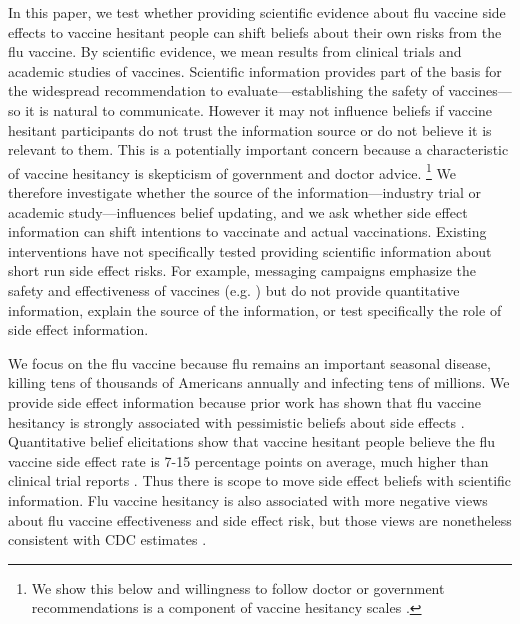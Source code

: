 In this paper, we test whether providing scientific evidence about flu vaccine side effects 
to vaccine hesitant people can shift beliefs about their own risks from the flu vaccine. By scientific evidence, we mean results from clinical trials and academic studies of vaccines.
Scientific information provides part of the basis for the widespread recommendation to 
evaluate---establishing the safety of vaccines---so it is natural to communicate. 
However it may not influence beliefs if vaccine hesitant participants do not trust the 
information source or do not believe it is relevant to them. This is a potentially 
important concern because a characteristic of vaccine hesitancy is skepticism of 
government and doctor advice.%
\footnote{We show this below and willingness to follow doctor or government recommendations
is a component of vaccine hesitancy scales \citep{larson2015measuring}.}
We therefore investigate whether 
the source of the information---industry trial or academic study---influences belief updating, 
and we ask whether
side effect information can shift intentions to vaccinate and actual vaccinations.
Existing interventions have not specifically tested providing scientific information about
short run side effect risks. For example, messaging campaigns emphasize the safety and 
effectiveness of vaccines (e.g. \citet{athey2023digital,alsan2024experimental}) but do 
not provide quantitative information, explain the source of the information, or test 
specifically the role of side effect information.

We focus on the flu vaccine because flu remains an important seasonal disease, killing tens of 
thousands of Americans annually and infecting tens of millions. We provide side effect information because 
prior work has shown that flu vaccine hesitancy is strongly associated with pessimistic 
beliefs about side effects 
\citep{chapman1999predictors,tsutsui2012economic}. Quantitative belief elicitations show that vaccine hesitant 
people believe the flu vaccine side effect rate is 7-15 percentage points on average, much higher than clinical 
trial reports \citep{sacks2025preferences,fda_flulaval_package_insert,fda_fluzone_quadrivalent_package_insert}. 
Thus there is scope to move side effect beliefs with scientific information. Flu vaccine hesitancy is also 
associated with more negative views about flu vaccine effectiveness and side effect risk, but those views 
are nonetheless consistent with CDC estimates \citep{sacks2025preferences}.

